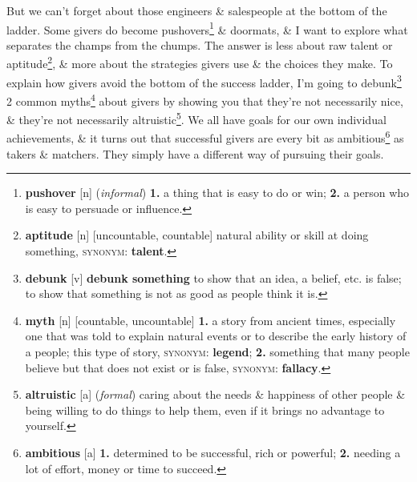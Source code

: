 \documentclass[oneside]{book}
\numberwithin{equation}{section}
\begin{document}
But we can't forget about those engineers \& salespeople at the bottom of the ladder. Some givers do become pushovers\footnote{\textbf{pushover} [n] (\textit{informal}) \textbf{1.} a thing that is easy to do or win; \textbf{2.} a person who is easy to persuade or influence.} \& doormats, \& I want to explore what separates the champs from the chumps. The answer is less about raw talent or aptitude\footnote{\textbf{aptitude} [n] [uncountable, countable] natural ability or skill at doing something, \textsc{synonym}: \textbf{talent}.}, \& more about the strategies givers use \& the choices they make. To explain how givers avoid the bottom of the success ladder, I'm going to debunk\footnote{\textbf{debunk} [v] \textbf{debunk something} to show that an idea, a belief, etc. is false; to show that something is not as good as people think it is.} 2 common myths\footnote{\textbf{myth} [n] [countable, uncountable] \textbf{1.} a story from ancient times, especially one that was told to explain natural events or to describe the early history of a people; this type of story, \textsc{synonym}: \textbf{legend}; \textbf{2.} something that many people believe but that does not exist or is false, \textsc{synonym}: \textbf{fallacy}.} about givers by showing you that they're not necessarily nice, \& they're not necessarily altruistic\footnote{\textbf{altruistic} [a] (\textit{formal}) caring about the needs \& happiness of other people \& being willing to do things to help them, even if it brings no advantage to yourself.}. We all have goals for our own individual achievements, \& it turns out that successful givers are every bit as ambitious\footnote{\textbf{ambitious} [a] \textbf{1.} determined to be successful, rich or powerful; \textbf{2.} needing a lot of effort, money or time to succeed.} as takers \& matchers. They simply have a different way of pursuing their goals.
\end{document}
